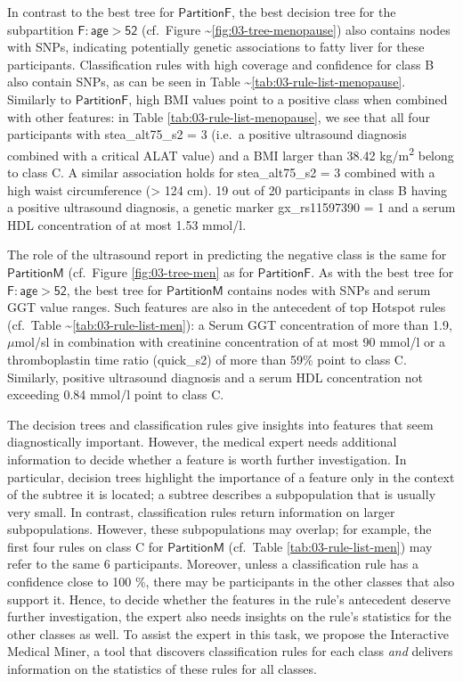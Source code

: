 \documentclass[
  oneside]{book}
\begin{document}
In contrast to the best tree for \(\mathsf{PartitionF}\), the best decision tree for the subpartition \(\mathsf{F:age>52}\) (cf.~Figure \textasciitilde\ref{fig:03-tree-menopause}) also contains nodes with SNPs, indicating potentially genetic associations to fatty liver for these participants.
Classification rules with high coverage and confidence for class B also contain SNPs, as can be seen in Table \textasciitilde\ref{tab:03-rule-list-menopause}.
Similarly to \(\mathsf{PartitionF}\), high BMI values point to a positive class when combined with other features: in Table \ref{tab:03-rule-list-menopause}, we see that all four participants with stea\_alt75\_s2 = 3 (i.e.~a positive ultrasound diagnosis combined with a critical ALAT value) and a BMI larger than 38.42 kg/m\textsuperscript{2} belong to class C.
A similar association holds for stea\_alt75\_s2 = 3 combined with a high waist circumference (\textgreater{} 124 cm).
19 out of 20 participants in class B having a positive ultrasound diagnosis, a genetic marker gx\_rs11597390 = 1 and a serum HDL concentration of at most 1.53 mmol/l.

The role of the ultrasound report in predicting the negative class is the same for \(\mathsf{PartitionM}\) (cf.~Figure \ref{fig:03-tree-men} as for \(\mathsf{PartitionF}\).
As with the best tree for \(\mathsf{F:age>52}\), the best tree for \(\mathsf{PartitionM}\) contains nodes with SNPs and serum GGT value ranges.
Such features are also in the antecedent of top Hotspot rules (cf.~Table \textasciitilde\ref{tab:03-rule-list-men}):
a Serum GGT concentration of more than 1.9,\(\mu\)mol/sl in combination with creatinine concentration of at most 90 mmol/l or a thromboplastin time ratio (quick\_s2) of more than 59\% point to class C.
Similarly, positive ultrasound diagnosis and a serum HDL concentration not exceeding 0.84 mmol/l point to class C.

The decision trees and classification rules give insights into features that seem diagnostically important.
However, the medical expert needs additional information to decide whether a feature is worth further investigation.
In particular, decision trees highlight the importance of a feature only in the context of the subtree it is located; a subtree describes a subpopulation that is usually very small.
In contrast, classification rules return information on larger subpopulations.
However, these subpopulations may overlap; for example, the first four rules on class C for \(\mathsf{PartitionM}\) (cf.~Table \ref{tab:03-rule-list-men}) may refer to the same 6 participants.
Moreover, unless a classification rule has a confidence close to 100 \%, there may be participants in the other classes that also support it.
Hence, to decide whether the features in the rule's antecedent deserve further investigation, the expert also needs insights on the rule's statistics for the other classes as well.
To assist the expert in this task, we propose the Interactive Medical Miner, a tool that discovers classification rules for each class \emph{and} delivers information on the statistics of these rules for all classes.
\end{document}
